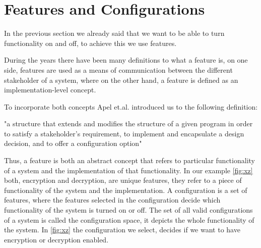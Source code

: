 \section{Features and Configurations}

In the previous section we already said that we want to be able to turn functionality on and off, to achieve this we use features.

During the years there have been many definitions to what a feature is, on one side, features are used as a means of communication between
the different stakeholder of a system, where on the other hand, a feature is defined as an implementation-level concept. 

To incorporate both concepts Apel et.al. \cite[p. 18]{Feature-Oriented-Software-Product-Lines} introduced us to the following definition:

"a structure that extends and modifies the structure of a
given program in order to satisfy a stakeholder's requirement, to implement and
encapsulate a design decision, and to offer a configuration option"

Thus, a feature is both an abstract concept that refers to particular functionality of a system and the implementation of that functionality.
In our example \ref{fig:xz} both, encryption and decryption, are unique features, they refer to a piece of functionality of the system and the
implementation. 
A configuration is a set of features, where the features selected in the configuration decide which functionality of the system is turned on or off.
The set of all valid configurations of a system is called the configuration space, it depicts the whole functionality of the system.
In \ref{fig:xz} the configuration we select, decides if we want to have encryption or decryption enabled.